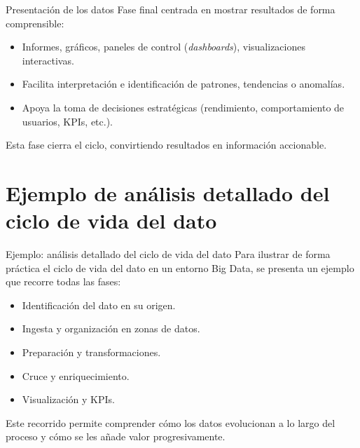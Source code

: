\documentclass{beamer}
\begin{document}
\begin{frame}{Presentación de los datos}
Fase final centrada en mostrar resultados de forma comprensible:
\begin{itemize}
    \item Informes, gráficos, paneles de control (\textit{dashboards}), visualizaciones interactivas.
    \item Facilita interpretación e identificación de patrones, tendencias o anomalías.
    \item Apoya la toma de decisiones estratégicas (rendimiento, comportamiento de usuarios, KPIs, etc.).
\end{itemize}

Esta fase cierra el ciclo, convirtiendo resultados en información accionable.
\end{frame}


\section{Ejemplo de análisis detallado del ciclo de vida del dato}

\begin{frame}{Ejemplo: análisis detallado del ciclo de vida del dato}
Para ilustrar de forma práctica el ciclo de vida del dato en un entorno Big Data, se presenta un ejemplo que recorre todas las fases:
\begin{itemize}
    \item Identificación del dato en su origen.
    \item Ingesta y organización en zonas de datos.
    \item Preparación y transformaciones.
    \item Cruce y enriquecimiento.
    \item Visualización y KPIs.
\end{itemize}
Este recorrido permite comprender cómo los datos evolucionan a lo largo del proceso y cómo se les añade valor progresivamente.
\end{frame}
\end{document}
